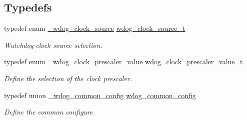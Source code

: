 \subsection*{Typedefs}
\begin{DoxyCompactItemize}
\item 
typedef enum \hyperlink{group__wdog__hal_ga39f05d1e3aef745dad3b9e3ebd37260a}{\+\_\+wdog\+\_\+clock\+\_\+source} \hyperlink{group__wdog__hal_gaefa111de2da7243f0be401a7eeba88d2}{wdog\+\_\+clock\+\_\+source\+\_\+t}\hypertarget{group__wdog__hal_gaefa111de2da7243f0be401a7eeba88d2}{}\label{group__wdog__hal_gaefa111de2da7243f0be401a7eeba88d2}

\begin{DoxyCompactList}\small\item\em Watchdog clock source selection. \end{DoxyCompactList}\item 
typedef enum \hyperlink{group__wdog__hal_ga21b132de3ebfea46c098feb9a0ee742d}{\+\_\+wdog\+\_\+clock\+\_\+prescaler\+\_\+value} \hyperlink{group__wdog__hal_ga5659968e0766fb95c68ff0e90423064c}{wdog\+\_\+clock\+\_\+prescaler\+\_\+value\+\_\+t}\hypertarget{group__wdog__hal_ga5659968e0766fb95c68ff0e90423064c}{}\label{group__wdog__hal_ga5659968e0766fb95c68ff0e90423064c}

\begin{DoxyCompactList}\small\item\em Define the selection of the clock prescaler. \end{DoxyCompactList}\item 
typedef union \hyperlink{union__wdog__common__config}{\+\_\+wdog\+\_\+common\+\_\+config} \hyperlink{group__wdog__hal_ga6226a4eb4833dc0ccedd0e01af1e4819}{wdog\+\_\+common\+\_\+config}\hypertarget{group__wdog__hal_ga6226a4eb4833dc0ccedd0e01af1e4819}{}\label{group__wdog__hal_ga6226a4eb4833dc0ccedd0e01af1e4819}

\begin{DoxyCompactList}\small\item\em Define the common configure. \end{DoxyCompactList}\end{DoxyCompactItemize}
